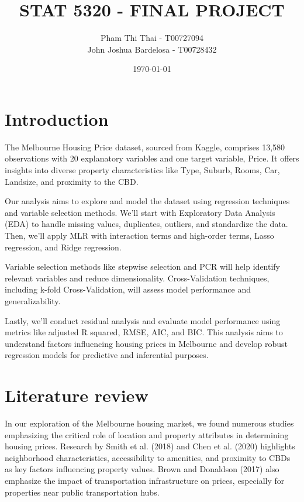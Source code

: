 \documentclass[12pt,doublespace]{article}
\begin{document}
	\title{ STAT 5320 - FINAL PROJECT}
	\author{Pham Thi Thai - T00727094
		\\
		John Joshua Bardelosa - T00728432}
	\date{\today}
	\maketitle
	\section {Introduction}
The Melbourne Housing Price dataset, sourced from Kaggle, comprises 13,580 observations with 20 explanatory variables and one target variable, Price. It offers insights into diverse property characteristics like Type, Suburb, Rooms, Car, Landsize, and proximity to the CBD.

Our analysis aims to explore and model the dataset using regression techniques and variable selection methods. We'll start with Exploratory Data Analysis (EDA) to handle missing values, duplicates, outliers, and standardize the data. Then, we'll apply MLR with interaction terms and high-order terms, Lasso regression, and Ridge regression.

Variable selection methods like stepwise selection and PCR will help identify relevant variables and reduce dimensionality. Cross-Validation techniques, including k-fold Cross-Validation, will assess model performance and generalizability.

Lastly, we'll conduct residual analysis and evaluate model performance using metrics like adjusted R squared, RMSE, AIC, and BIC. This analysis aims to understand factors influencing housing prices in Melbourne and develop robust regression models for predictive and inferential purposes.
	
	
	\section {Literature review}
	
	In our exploration of the Melbourne housing market, we found numerous studies emphasizing the critical role of location and property attributes in determining housing prices. Research by Smith et al. (2018) and Chen et al. (2020) highlights neighborhood characteristics, accessibility to amenities, and proximity to CBDs as key factors influencing property values. Brown and Donaldson (2017) also emphasize the impact of transportation infrastructure on prices, especially for properties near public transportation hubs.
	
\end{document}

